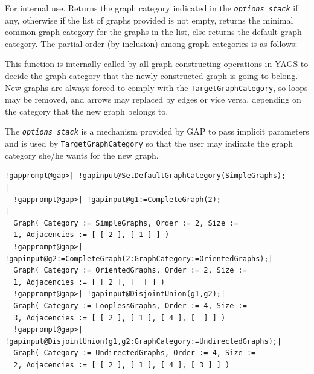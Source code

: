 \documentclass[a4paper,11pt]{report}
\begin{document}
{{{ 

For internal use. Returns the graph category indicated in the \mbox{\texttt{\mdseries\slshape options stack}} if any, otherwise if the list of graphs provided is not empty, returns the
minimal common graph category for the graphs in the list, else returns the
default graph category. The partial order (by inclusion) among graph
categories is as follows: 




This function is internally called by all graph constructing operations in \textsf{YAGS} to decide the graph category that the newly constructed graph is going to
belong. New graphs are always forced to comply with the \texttt{TargetGraphCategory}, so loops may be removed, and arrows may replaced by edges or vice versa,
depending on the category that the new graph belongs to. 

The \mbox{\texttt{\mdseries\slshape options stack}} is a mechanism provided by \textsf{GAP} to pass implicit parameters and is used by \texttt{TargetGraphCategory} so that the user may indicate the graph category she/he wants for the new
graph. 

 
\begin{Verbatim}[commandchars=!@|,fontsize=\small,frame=single,label=Example]
  !gapprompt@gap>| !gapinput@SetDefaultGraphCategory(SimpleGraphs);             |
  !gapprompt@gap>| !gapinput@g1:=CompleteGraph(2);                              |
  Graph( Category := SimpleGraphs, Order := 2, Size := 
  1, Adjacencies := [ [ 2 ], [ 1 ] ] )
  !gapprompt@gap>| !gapinput@g2:=CompleteGraph(2:GraphCategory:=OrientedGraphs);|
  Graph( Category := OrientedGraphs, Order := 2, Size := 
  1, Adjacencies := [ [ 2 ], [  ] ] )
  !gapprompt@gap>| !gapinput@DisjointUnion(g1,g2);|
  Graph( Category := LooplessGraphs, Order := 4, Size := 
  3, Adjacencies := [ [ 2 ], [ 1 ], [ 4 ], [  ] ] )
  !gapprompt@gap>| !gapinput@DisjointUnion(g1,g2:GraphCategory:=UndirectedGraphs);|
  Graph( Category := UndirectedGraphs, Order := 4, Size := 
  2, Adjacencies := [ [ 2 ], [ 1 ], [ 4 ], [ 3 ] ] )
\end{Verbatim}
 

}}}
\end{document}
